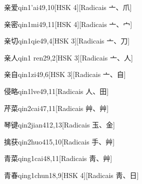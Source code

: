 \begin{entry}{亲爱}{qin1'ai4}{9,10}[HSK 4][Radicais ⼇、⽖]
\end{entry}

\begin{entry}{亲密}{qin1mi4}{9,11}[HSK 4][Radicais ⼇、⼧]
\end{entry}

\begin{entry}{亲切}{qin1qie4}{9,4}[HSK 3][Radicais ⼇、⼑]
\end{entry}

\begin{entry}{亲人}{qin1 ren2}{9,2}[HSK 3][Radicais ⼇、⼈]
\end{entry}

\begin{entry}{亲自}{qin1zi4}{9,6}[HSK 3][Radicais ⼇、⾃]
\end{entry}

\begin{entry}{侵略}{qin1lve4}{9,11}[Radicais ⼈、⽥]
\end{entry}

\begin{entry}{芹菜}{qin2cai4}{7,11}[Radicais ⾋、⾋]
\end{entry}

\begin{entry}{琴键}{qin2jian4}{12,13}[Radicais ⽟、⾦]
\end{entry}

\begin{entry}{擒获}{qin2huo4}{15,10}[Radicais ⼿、⾋]
\end{entry}

\begin{entry}{青菜}{qing1cai4}{8,11}[Radicais ⾭、⾋]
\end{entry}

\begin{entry}{青春}{qing1chun1}{8,9}[HSK 4][Radicais ⾭、⽇]
\end{entry}

